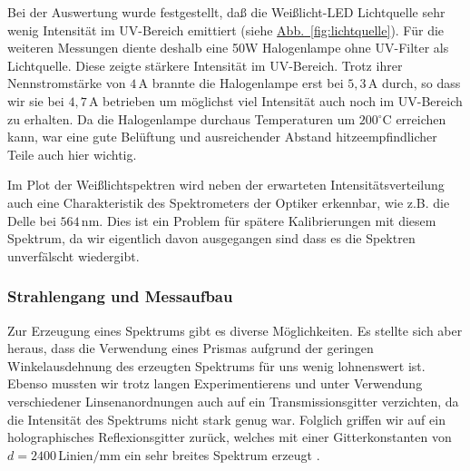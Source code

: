 \documentclass[11pt]{scrartcl}
\newcommand{\unit}[1]{\ensuremath{\,\mathrm{#1}}} %
\newcommand{\degr}{\ensuremath{^\circ}}
\newcommand{\cel}{\ensuremath{\degr\mathrm{C}}}
\newcommand{\hypref}[2]{\hyperref[#2]{{#1}~\ref{#2}}}
\begin{document}
Bei der Auswertung wurde festgestellt, da\ss{} die Weißlicht-LED Lichtquelle sehr wenig Intensit\"at im UV-Bereich emittiert (siehe \hypref{Abb.}{fig:lichtquelle}). F\"ur die weiteren Messungen diente deshalb eine 50W Halogenlampe ohne UV-Filter als Lichtquelle. Diese zeigte st\"arkere Intensit\"at im UV-Bereich. Trotz ihrer Nennstromstärke von $4\unit{A}$ brannte die Halogenlampe erst bei $5,3\unit{A}$ durch, so dass wir sie bei $4,7\unit{A}$ betrieben um möglichst viel Intensität auch noch im UV-Bereich zu erhalten. Da die Halogenlampe durchaus Temperaturen um $200\cel$ erreichen kann, war eine gute Bel\"uftung und ausreichender Abstand hitzeempfindlicher Teile auch hier wichtig.

Im Plot der Weißlichtspektren wird neben der erwarteten Intensitätsverteilung auch eine Charakteristik des Spektrometers der Optiker erkennbar, wie z.B. die Delle bei $564\unit{nm}$. Dies ist ein Problem für spätere Kalibrierungen mit diesem Spektrum, da wir eigentlich davon ausgegangen sind dass es die Spektren unverfälscht wiedergibt.

\subsubsection{Strahlengang und Messaufbau} %
Zur Erzeugung eines Spektrums gibt es diverse M\"oglichkeiten. Es stellte sich aber heraus, dass die Verwendung eines Prismas aufgrund der geringen Winkelausdehnung des erzeugten Spektrums f\"ur uns wenig lohnenswert ist. Ebenso mussten wir trotz langen Experimentierens und unter Verwendung verschiedener Linsenanordnungen auch auf ein Transmissionsgitter verzichten, da die Intensit\"at des Spektrums nicht stark genug war. Folglich griffen wir auf ein holographisches Reflexionsgitter zur\"uck, welches mit einer Gitterkonstanten von $d=2400\unit{\text{Linien}/mm}$ ein sehr breites Spektrum erzeugt .%
\end{document}
